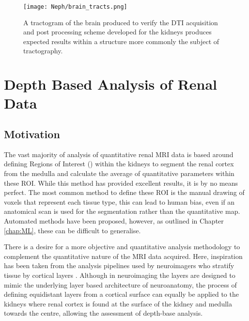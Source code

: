 \begin{figure}[H]
	\centering
	\texttt{[image: Neph/brain\_tracts.png]}
	\caption{A tractogram of the brain produced to verify the \ac{DTI} acquisition and post processing scheme developed for the kidneys produces expected results within a structure more commonly the subject of tractography.}
	\label{fig:ex_dti_brain_tracts}	
\end{figure}

\section{Depth Based Analysis of Renal Data}
\label{sec:ex_layers}
\subsection{Motivation}
The vast majority of analysis of quantitative renal \ac{MRI} data is based around defining Regions of Interest () within the kidneys to segment the renal cortex from the medulla and calculate the average of quantitative parameters within these \ac{ROI}. While this method has provided excellent results, it is by no means perfect. The most common method to define these \ac{ROI} is the manual drawing of voxels that represent each tissue type, this can lead to human bias, even if an anatomical scan is used for the segmentation rather than the quantitative map. Automated methods have been proposed, however, as outlined in Chapter \ref{chap:ML}, these can be difficult to generalise.

There is a desire for a more objective and quantitative analysis methodology to complement the quantitative nature of the \ac{MRI} data acquired. Here, inspiration has been taken from the analysis pipelines used by neuroimagers who stratify tissue by cortical layers \cite{self_benchmarking_2019, muckli_contextual_2015, waehnert_anatomically_2014, taso_regional_2021}. Although in neuroimaging the layers are designed to mimic the underlying layer based architecture of neuroanatomy, the process of defining equidistant layers from a cortical surface can equally be applied to the kidneys where renal cortex is found at the surface of the kidney and medulla towards the centre, allowing the assessment of depth-base analysis. 

